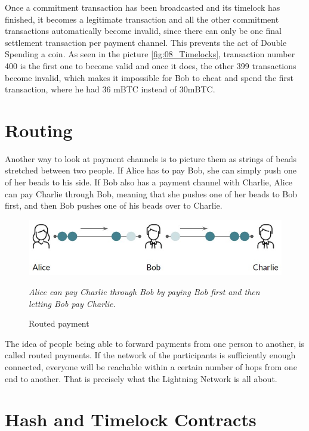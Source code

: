 \documentclass[a4paper, 12pt]{report}
\begin{document}
\par Once a commitment transaction has been broadcasted and its timelock has finished, it becomes a legitimate transaction and all the other commitment transactions automatically become invalid, since there can only be one final settlement transaction per payment channel. This prevents the act of Double Spending a coin. As seen in the picture \ref{fig:08_Timelocks}, transaction number 400 is the first one to become valid and once it does, the other 399 transactions become invalid, which makes it impossible for Bob to cheat and spend the first transaction, where he had 36 mBTC instead of 30mBTC.

\section{Routing}

\par Another way to look at payment channels is to picture them as strings of beads stretched between two people. If Alice has to pay Bob, she can simply push one of her beads to his side. If Bob also has a payment channel with Charlie, Alice can pay Charlie through Bob, meaning that she pushes one of her beads to Bob first, and then Bob pushes one of his beads over to Charlie.

\begin{figure}[H]
	\centering
	\includegraphics[width=12cm]{09_Beads}
	\caption{Routed payment}
	\medskip
	\small \textit{Alice can pay Charlie through Bob by paying Bob first and then letting Bob pay Charlie.}
	\label{fig:09_Beads}
\end{figure}

\par The idea of people being able to forward payments from one person to another, is called routed payments. If the network of the participants is sufficiently enough connected, everyone will be reachable within a certain number of hops from one end to another. That is precisely what the Lightning Network is all about.

\section{Hash and Timelock Contracts}
\end{document}
